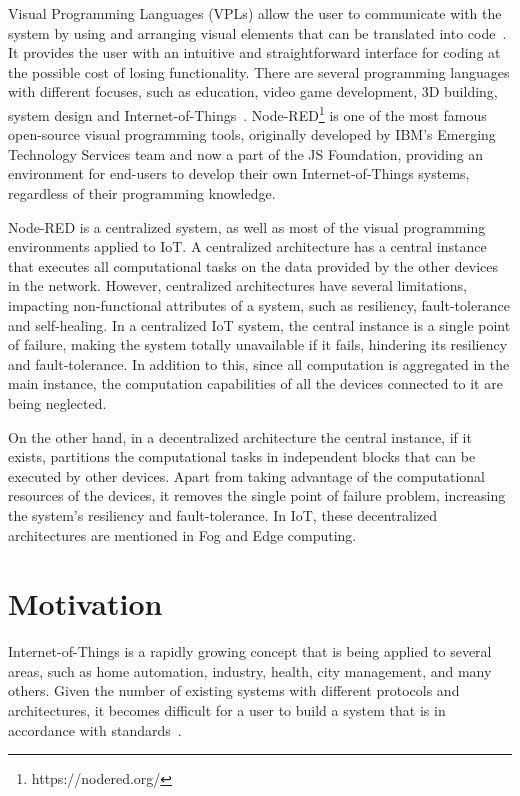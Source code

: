 Visual Programming Languages (VPLs) allow the user to communicate with the system by using and arranging visual elements that can be translated into code~\cite{vpl-book}. It provides the user with an intuitive and straightforward interface for coding at the possible cost of losing functionality. There are several programming languages with different focuses, such as education, video game development, 3D building, system design and Internet-of-Things~\cite{survey_vpl_iot}. Node-RED\footnote{https://nodered.org/} is one of the most famous open-source visual programming tools, originally developed by IBM’s Emerging Technology Services team and now a part of the JS Foundation, providing an environment for end-users to develop their own Internet-of-Things systems, regardless of their programming knowledge.

Node-RED is a centralized system, as well as most of the visual programming environments applied to IoT. A centralized architecture has a central instance that executes all computational tasks on the data provided by the other devices in the network. However, centralized architectures have several limitations, impacting non-functional attributes of a system, such as resiliency, fault-tolerance and self-healing. In a centralized IoT system, the central instance is a single point of failure, making the system totally unavailable if it fails, hindering its resiliency and fault-tolerance. In addition to this, since all computation is aggregated in the main instance, the computation capabilities of all the devices connected to it are being neglected.

On the other hand, in a decentralized architecture the central instance, if it exists, partitions the computational tasks in independent blocks that can be executed by other devices. Apart from taking advantage of the computational resources of the devices, it removes the single point of failure problem, increasing the system's resiliency and fault-tolerance. In IoT, these decentralized architectures are mentioned in Fog and Edge computing. 

\section{Motivation} \label{sec:motivation}

Internet-of-Things is a rapidly growing concept that is being applied to several areas, such as home automation, industry, health, city management, and many others. Given the number of existing systems with different protocols and architectures, it becomes difficult for a user to build a system that is in accordance with standards~\cite{standard-iot}. 

